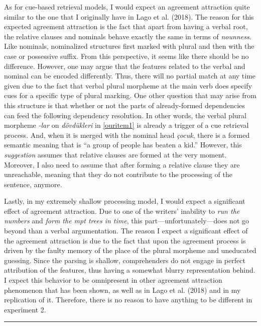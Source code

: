 \documentclass[doc]{apa6}
\begin{document}
As for cue-based retrieval models, I would expect an agreement attraction quite similar to the one that I originally have in Lago et al. (2018). The reason for this expected agreement attraction is the fact that apart from having a verbal root, the relative clauses and nominals behave exactly the same in terms of \emph{nounness}. Like nominals, nominalized structures first marked with plural and then with the case or possessive suffix. From this perspective, it seems like there should be no difference. However, one may argue that the features related to the verbal and nominal can be encoded differently. Thus, there will no partial match at any time given due to the fact that verbal plural morpheme at the main verb does specify cues for a specific type of plural marking. One other question that may arise from this structure is that whether or not the parts of already-formed dependencies can feed the following dependency resolution. In other words, the verbal plural morpheme \emph{-lar} on \emph{dövdükleri} in \autoref{ouritem1} is already a trigger of a cue retrieval process. And, when it is merged with the nominal head \emph{çocuk}, there is a formed semantic meaning that is ``a group of people has beaten a kid.'' However, this \emph{suggestion} assumes that relative clauses are formed at the very moment. Moreover, I also need to assume that after forming a relative clause they are unreachable, meaning that they do not contribute to the processing of the sentence, anymore.

Lastly, in my extremely shallow processing model, I would expect a significant effect of agreement attraction. Due to one of the writers' inability to \emph{run the numbers} and \emph{form the mpt trees in time}, this part---unfortunately---does not go beyond than a verbal argumentation. The reason I expect a significant effect of the agreement attraction is due to the fact that upon the agreement process is driven by the faulty memory of the place of the plural morpheme and uneducated guessing. Since the parsing is shallow, comprehenders do not engage in perfect attribution of the features, thus having a somewhat blurry representation behind. I expect this behavior to be omnipresent in other agreement attraction phenomenon that has been shown, as well as in Lago et al. (2018) and in my replication of it. Therefore, there is no reason to have anything to be different in experiment 2.

\begin{center}\rule{0.5\linewidth}{\linethickness}\end{center}
\end{document}
